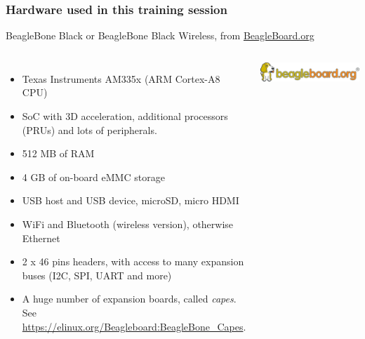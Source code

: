 \begin{frame}
\frametitle{Hardware used in this training session}
  BeagleBone Black or BeagleBone Black Wireless, from
\href{https://beagleboard.org}{BeagleBoard.org}
  \begin{columns}
    \footnotesize
    \begin{itemize}
      \item Texas Instruments AM335x (ARM Cortex-A8 CPU)
      \item SoC with 3D acceleration, additional processors
        (PRUs) and lots of peripherals.
      \item 512 MB of RAM
      \item 4 GB of on-board eMMC storage
      \item USB host and USB device, microSD, micro HDMI
      \item WiFi and Bluetooth (wireless version), otherwise Ethernet
      \item 2 x 46 pins headers, with access to many expansion buses
        (I2C, SPI, UART and more)
      \item A huge number of expansion boards, called {\em capes}.
        See \url{https://elinux.org/Beagleboard:BeagleBone_Capes}.
    \end{itemize}
    \begin{center}
      \includegraphics[width=\textwidth]{slides/beagleboneblack-board/beagle_logo_326x60.png}\\

\end{center}
\end{columns}
\end{frame}
